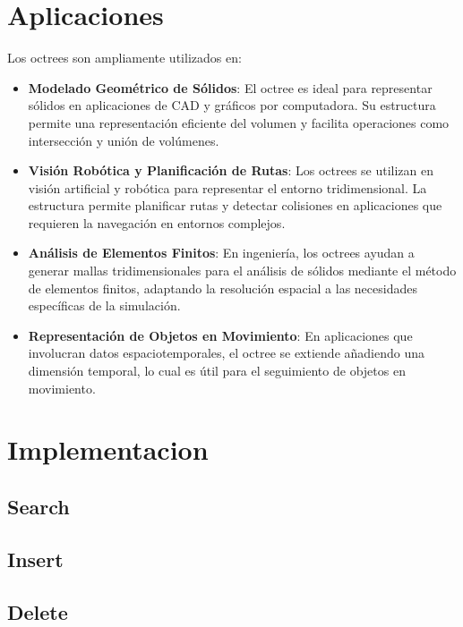 \documentclass{article}
\begin{document}
\section{Aplicaciones}
Los octrees son ampliamente utilizados en:
\begin{itemize}
    \item \textbf{Modelado Geométrico de Sólidos}: El octree es ideal para representar sólidos en aplicaciones de CAD y gráficos por computadora. Su estructura permite una representación eficiente del volumen y facilita operaciones como intersección y unión de volúmenes.
    \item \textbf{Visión Robótica y Planificación de Rutas}: Los octrees se utilizan en visión artificial y robótica para representar el entorno tridimensional. La estructura permite planificar rutas y detectar colisiones en aplicaciones que requieren la navegación en entornos complejos.
    \item \textbf{Análisis de Elementos Finitos}: En ingeniería, los octrees ayudan a generar mallas tridimensionales para el análisis de sólidos mediante el método de elementos finitos, adaptando la resolución espacial a las necesidades específicas de la simulación.
    \item \textbf{Representación de Objetos en Movimiento}: En aplicaciones que involucran datos espaciotemporales, el octree se extiende añadiendo una dimensión temporal, lo cual es útil para el seguimiento de objetos en movimiento.
\end{itemize}
\section{Implementacion}
\subsection{Search}

\subsection{Insert}
\subsection{Delete}
\end{document}
